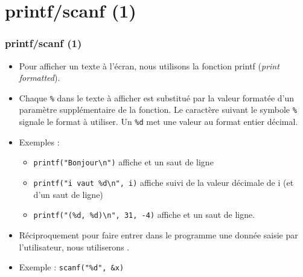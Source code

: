 \documentclass[xcolor=pdftex,svgnames,table]{beamer}
\begin{document}
\section{printf/scanf (1)}
\begin{frame}[fragile]
  \frametitle{printf/scanf (1) \nowrite}
\begin{itemize}
\item  Pour afficher un texte à l'écran, nous utilisons la fonction \alert{printf}
  (\emph{print formatted}). 
\item Chaque \verb+%+ 
dans le texte à afficher est substitué par la valeur formatée d'un
\alert{paramètre supplémentaire} de la fonction. Le caractère suivant le
symbole \verb+%+ 
signale le format à utiliser.  Un \verb+%d+
met une valeur au format \alert{entier décimal}.
\pause
\item Exemples :
  \begin{itemize}
\item
    \verb+printf("Bonjour\n")+ 
affiche  et un saut de
    ligne\pause
\item
    \verb+printf("i vaut %d\n", i)+ 
affiche  suivi de la valeur décimale de i (et d'un saut de
ligne)\pause
\item
    \verb+printf("(%d, %d)\n", 31, -4)+ 
affiche  et un saut de ligne.
 \end{itemize}
\pause
\item Réciproquement pour faire entrer dans le programme une donnée saisie par
  l'utilisateur, nous utiliserons \alert{}.
\item Exemple : \verb+scanf("%d", &x)+
\end{itemize}
\end{frame}
\end{document}
